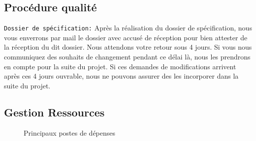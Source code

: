 \documentclass[]{scrartcl}
\begin{document}
\subsection{Procédure qualité}
\texttt{Dossier de spécification:} Après la réalisation du dossier de spécification, nous vous enverrons par mail le dossier avec accusé de réception pour bien attester de la réception du dit dossier. Nous attendons votre retour sous  4 jours. Si vous nous communiquez des souhaits de changement pendant ce délai là, nous les prendrons en compte pour la suite du projet. Si ces demandes de modifications arrivent après ces 4 jours ouvrable, nous ne pouvons assurer des les incorporer dans la suite du projet.
\subsection{Gestion Ressources}
\begin{center}
\begin{figure}[H]
\caption{Principaux postes de dépenses}
\end{figure}
\end{center}

\begin{appendices}
\end{appendices}
\end{document}
